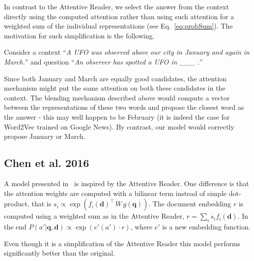 \documentclass[11pt]{article}
\newcommand{\MARTIN}[1]{{\color{black}#1}}
\newcommand{\RUDAA}[1]{{\color{black}#1}}
\newcommand{\ctxTransducer}{f}
\newcommand{\queryEncoder}{g}
\newcommand{\querySeq}{\mathbf{q}}
\newcommand{\documentSeq}{\mathbf{d}}
\begin{document}
\MARTIN{
In contrast to the Attentive Reader, we select the answer from the context directly using the computed attention rather than using such attention for a weighted sum of the individual representations (see Eq.~\ref{eq:probSum}).
The motivation for such simplification is the following.

Consider a context ``\emph{A UFO was observed above our city in January and again in March.}'' and  question ``\emph{An observer has spotted a UFO in \_\_\_ .}''

Since both January and March are equally good candidates, the attention mechanism might put the same attention on both these candidates in the context. The blending mechanism described above would compute a vector between the representations of these two words and propose the closest word as the answer - this may well happen to be February (it is indeed the case for Word2Vec trained on Google News). 
By contrast, our model would correctly propose January or March. 

}

\RUDAA{
\subsection{Chen et al. 2016}
A model presented in~\cite{chen2016thorough} is inspired by the Attentive Reader. One difference is that the attention weights are computed with a bilinear term instead of simple dot-product, that is $s_i \propto \exp \left( \ctxTransducer_i(\documentSeq)^\intercal\, W\, \queryEncoder(\querySeq) \right)$. The document embedding $r$ is computed using a weighted sum as in the Attentive Reader, $r = \sum_i s_i \ctxTransducer_i(\documentSeq)$. In the end $P(a'|\querySeq,\documentSeq) \propto \exp \left(e'(a') \cdot r \right)$, where $e'$ is a new embedding function.

Even though it is a simplification of the Attentive Reader this model performs significantly better than the original.



}
\end{document}
